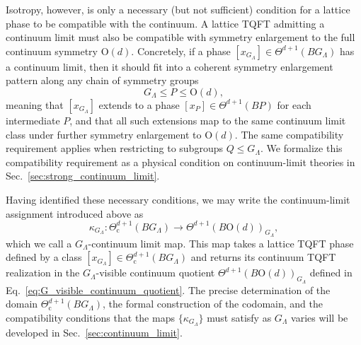 \documentclass[aps,prx,reprint,superscriptaddress,twocolumn,amsmath,amssymb,amsfonts, nofootinbib]{revtex4-2}
\theoremstyle{apsstyle}
\begin{document}
\bigskip

Isotropy, however, is only a necessary (but not sufficient) condition for a lattice phase to be compatible with the continuum. A lattice TQFT admitting a continuum limit must also be compatible with symmetry enlargement to the full continuum symmetry $\mathrm{O}(d)$. Concretely, if a phase $[x_{G_{\Lambda}}]\in \Theta^{d+1}(BG_{\Lambda})$ has a continuum limit, then it should fit into a coherent symmetry enlargement pattern along any chain of symmetry groups
\begin{equation*}
    G_{\Lambda}\leq P \leq \mathrm{O}(d),
\end{equation*}
meaning that $[x_{G_{\Lambda}}]$ extends to a phase $[x_{P}]\in \Theta^{d+1}(BP)$ for each intermediate $P$, and that all such extensions map to the same continuum limit class under further symmetry enlargement to $\mathrm{O}(d)$. The same compatibility requirement applies when restricting to subgroups $Q\leq G_{\Lambda}$. We formalize this compatibility requirement as a physical condition on continuum-limit theories in Sec.~\ref{sec:strong_continuum_limit}.

\bigskip 

Having identified these necessary conditions, we may write the continuum-limit assignment introduced above as
\begin{equation*}
  \kappa_{G_\Lambda}: \Theta^{d+1}_{\mathrm c}(BG_{\Lambda})
  \longrightarrow \Theta^{d+1}(B\mathrm{O}(d))_{G_{\Lambda}},
\end{equation*}
which we call a $G_{\Lambda}$-continuum limit map. This map takes a lattice TQFT phase defined by a class $[x_{G_{\Lambda}}]\in\Theta^{d+1}_{\mathrm c}(BG_{\Lambda})$ and returns its continuum TQFT realization in the $G_{\Lambda}$-visible continuum quotient $\Theta^{d+1}(B\mathrm{O}(d))_{G_{\Lambda}}$ defined in Eq.~\eqref{eq:G_visible_continuum_quotient}. The precise determination of the domain $\Theta^{d+1}_{\mathrm c}(BG_{\Lambda})$, the formal construction of the codomain, and the compatibility conditions that the maps $\{\kappa_{G_{\Lambda}}\}$ must satisfy as $G_{\Lambda}$ varies will be developed in Sec.~\ref{sec:continuum_limit}.

\bigskip 
\end{document}
